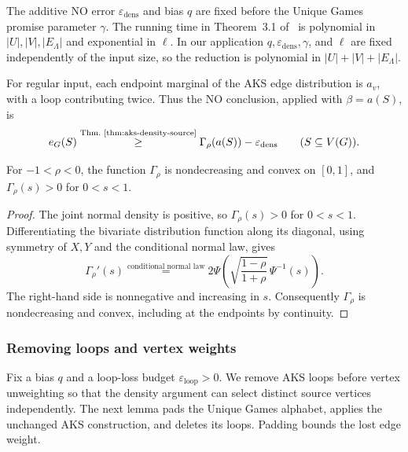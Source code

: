 The additive NO error $\varepsilon_{\mathrm{dens}}$ and bias $q$
are fixed before the Unique Games promise parameter $\gamma$.
The running time in Theorem~3.1 of~\cite{AKS2011}
is polynomial in $|U|,|V|,|E_\Lambda|$ and exponential in $\ell$.
In our application $q,\varepsilon_{\mathrm{dens}},\gamma$, and $\ell$
are fixed independently of the input size, so the reduction is
polynomial in $|U|+|V|+|E_\Lambda|$.

For regular input, each
endpoint marginal of the AKS edge distribution is $a_v$, with a
loop contributing twice. Thus the NO conclusion, applied with
$\beta=a(S)$, is
\begin{equation}\label{eq:aks-density-pointwise}
 e_G(S)\overset{\text{Thm.~\ref{thm:aks-density-source}}}{\geq}
 \Gamma_\rho(a(S))-\varepsilon_{\mathrm{dens}}
 \qquad(S\subseteq V(G)).
\end{equation}

\begin{lemma}\label{lem:aks-gaussian-properties}
For $-1<\rho<0$, the function $\Gamma_\rho$ is nondecreasing and
convex on $[0,1]$, and $\Gamma_\rho(s)>0$ for $0<s<1$.
\end{lemma}

\begin{proof}
The joint normal density is positive, so $\Gamma_\rho(s)>0$ for
$0<s<1$. Differentiating the bivariate distribution function along
its diagonal, using symmetry of $X,Y$ and the conditional normal
law, gives
\begin{equation}\label{eq:aks-gaussian-derivative}
 \Gamma_\rho'(s)\overset{\text{conditional normal law}}{=}
 2\Psi\!\left(\sqrt{\frac{1-\rho}{1+\rho}}\,\Psi^{-1}(s)\right).
\end{equation}
The right-hand side is nonnegative and increasing in $s$.
Consequently $\Gamma_\rho$ is nondecreasing and convex, including
at the endpoints by continuity.
\end{proof}

\subsubsection{Removing loops and vertex weights}

Fix a bias $q$ and a loop-loss budget
$\varepsilon_{\mathrm{loop}}>0$. We remove AKS loops before vertex
unweighting so that the density argument can select distinct source
vertices independently. The next lemma pads the Unique Games alphabet,
applies the unchanged AKS construction, and deletes its loops. Padding
bounds the lost edge weight.

